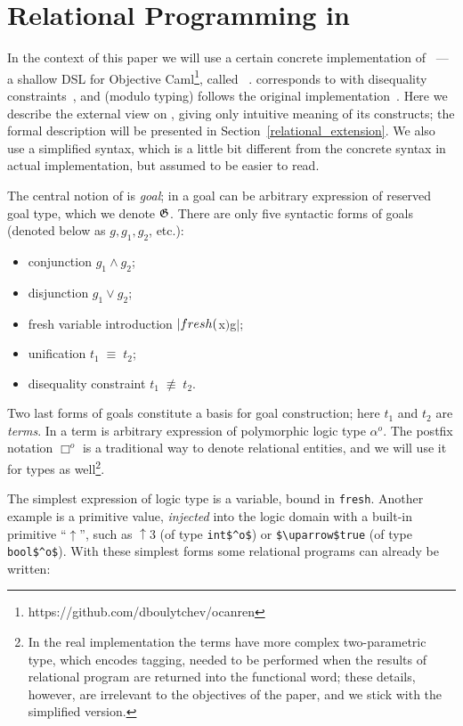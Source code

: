 \section{Relational Programming in \miniKanren}
\label{ocanren}

In the context of this paper we will use a certain concrete implementation of \miniKanren~--- a shallow DSL for Objective 
Caml\footnote{https://github.com/dboulytchev/ocanren}, called \ocanren~\cite{ocanren}. \ocanren corresponds to \miniKanren with
disequality constraints~\cite{CKanren}, and (modulo typing) follows the original implementation~\cite{MicroKanren}. Here we describe the external view 
on \ocanren, giving only intuitive meaning of its constructs; the formal description will be presented in Section~\ref{relational_extension}.
We also use a simplified syntax, which is a little bit different from the concrete syntax in actual implementation, but assumed to
be easier to read.

The central notion of \miniKanren is \emph{goal}; in \ocanren a goal can be arbitrary expression of reserved goal type, which we denote $\mathfrak G$.
There are only five syntactic forms of goals (denoted below as $g, g_1, g_2$, etc.):

\begin{itemize}
  \item conjunction $g_1\wedge g_2$;
  \item disjunction $g_1\vee g_2$;
  \item fresh variable introduction $\lstinline|fresh ($x$) $\;g$|$;
  \item unification $t_1\;\equiv\;t_2$;
  \item disequality constraint $t_1\;\not\equiv\;t_2$.
\end{itemize}

Two last forms of goals constitute a basis for goal construction; here $t_1$ and $t_2$ are \emph{terms}. In \ocanren a term is arbitrary expression of polymorphic logic type $\alpha^o$. The postfix notation $\Box^o$ is a traditional way to denote relational entities, and we will use it for types as well\footnote{In the real implementation the terms have more complex two-parametric type, which encodes tagging, needed to be performed when the results of relational program are returned into the functional word; these details, however, are irrelevant to the objectives of the paper, and we stick with the simplified version.}.

The simplest expression of logic type is a variable, bound in \lstinline|fresh|. Another example is a primitive value, \emph{injected} into the logic domain with a built-in primitive ``$\uparrow$'', such as $\uparrow\!3$ (of type \lstinline|int$^o$|) or \lstinline|$\uparrow$true| (of type \lstinline|bool$^o$|). With these simplest forms some relational programs can already be written:

